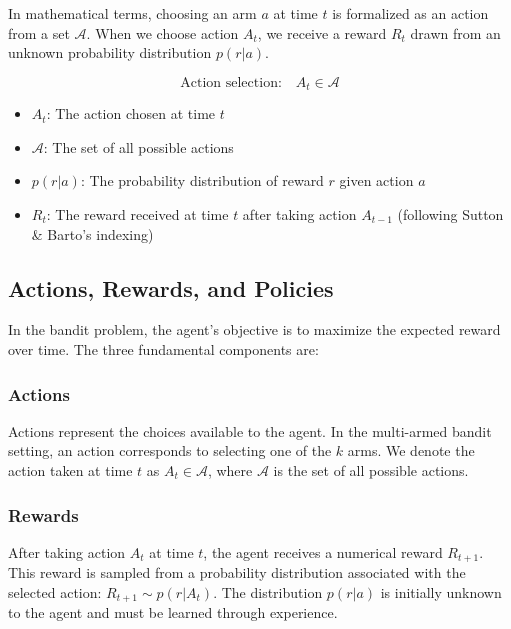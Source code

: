 \documentclass{article}
\begin{document}
In mathematical terms, choosing an arm $a$ at time $t$ is formalized as an action from a set $\mathcal{A}$. When we choose action $A_t$, we receive a reward $R_t$ drawn from an unknown probability distribution $p(r|a)$.

\begin{equation}
    \text{Action selection:} \quad A_t \in \mathcal{A}
\end{equation}

\begin{tcolorbox}[colback=blue!5!white,colframe=blue!75!black,title=Notation Overview]
\begin{itemize}
    \item $A_t$: The action chosen at time $t$
    \item $\mathcal{A}$: The set of all possible actions
    \item $p(r|a)$: The probability distribution of reward $r$ given action $a$
    \item $R_t$: The reward received at time $t$ after taking action $A_{t-1}$ (following Sutton \& Barto's indexing)
\end{itemize}
\end{tcolorbox}

\subsection{Actions, Rewards, and Policies}
In the bandit problem, the agent's objective is to maximize the expected reward over time. The three fundamental components are:

\subsubsection{Actions}
Actions represent the choices available to the agent. In the multi-armed bandit setting, an action corresponds to selecting one of the $k$ arms. We denote the action taken at time $t$ as $A_t \in \mathcal{A}$, where $\mathcal{A}$ is the set of all possible actions.

\subsubsection{Rewards}
After taking action $A_t$ at time $t$, the agent receives a numerical reward $R_{t+1}$. This reward is sampled from a probability distribution associated with the selected action: $R_{t+1} \sim p(r|A_t)$. The distribution $p(r|a)$ is initially unknown to the agent and must be learned through experience.
\end{document}
